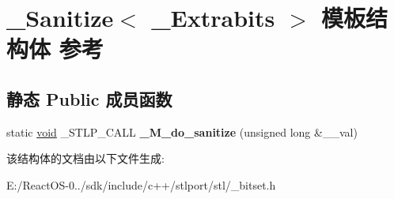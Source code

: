 \hypertarget{struct___sanitize}{}\section{\+\_\+\+Sanitize$<$ \+\_\+\+Extrabits $>$ 模板结构体 参考}
\label{struct___sanitize}
\subsection*{静态 Public 成员函数}
\begin{DoxyCompactItemize}
\item 
\mbox{\label{struct___sanitize_a466501b65723acb22c64f87c679d0192}} 
static \hyperlink{interfacevoid}{void} \+\_\+\+S\+T\+L\+P\+\_\+\+C\+A\+LL {\bfseries \+\_\+\+M\+\_\+do\+\_\+sanitize} (unsigned long \&\+\_\+\+\_\+val)
\end{DoxyCompactItemize}


该结构体的文档由以下文件生成\+:\begin{DoxyCompactItemize}
\item 
E\+:/\+React\+O\+S-\/0../sdk/include/c++/stlport/stl/\+\_\+bitset.\+h\end{DoxyCompactItemize}
